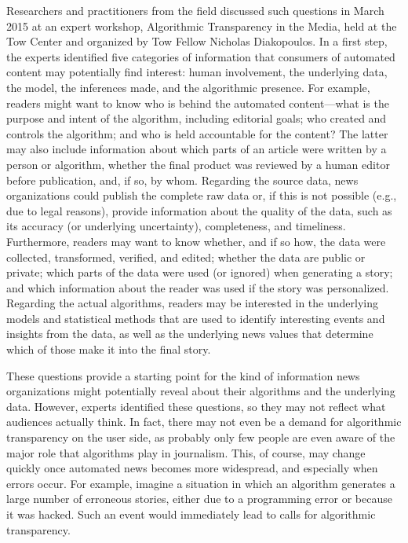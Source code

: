 \documentclass[notoc, symmetric, nobib, nols]{towcenter-guideto-book}
\begin{document}
Researchers and practitioners from the field discussed such questions in March 2015 at an expert workshop, Algorithmic Transparency in the Media, held at the Tow Center and organized by Tow Fellow Nicholas Diakopoulos. In a first step, the experts identified five categories of information that consumers of automated content may potentially find interest: human involvement, the underlying data, the model, the inferences made, and the algorithmic presence.\autocite{diak15} For example, readers might want to know who is behind the automated content---what is the purpose and intent of the algorithm, including editorial goals; who created and controls the algorithm; and who is held accountable for the content? The latter may also include information about which parts of an article were written by a person or algorithm, whether the final product was reviewed by a human editor before publication, and, if so, by whom. Regarding the source data, news organizations could publish the complete raw data or, if this is not possible (e.g., due to legal reasons), provide information about the quality of the data, such as its accuracy (or underlying uncertainty), completeness, and timeliness. Furthermore, readers may want to know whether, and if so how, the data were collected, transformed, verified, and edited; whether the data are public or private; which parts of the data were used (or ignored) when generating a story; and which information about the reader was used if the story was personalized. Regarding the actual algorithms, readers may be interested in the underlying models and statistical methods that are used to identify interesting events and insights from the data, as well as the underlying news values that determine which of those make it into the final story. 

These questions provide a starting point for the kind of information news organizations might potentially reveal about their algorithms and the underlying data. However, experts identified these questions, so they may not reflect what audiences actually think. In fact, there may not even be a demand for algorithmic transparency on the user side, as probably only few people are even aware of the major role that algorithms play in journalism. This, of course, may change quickly once automated news becomes more widespread, and especially when errors occur. For example, imagine a situation in which an algorithm generates a large number of erroneous stories, either due to a programming error or because it was hacked. Such an event would immediately lead to calls for algorithmic transparency. 
\end{document}
